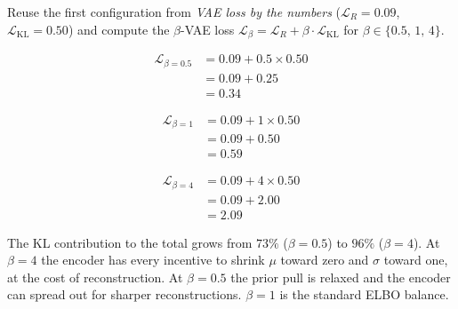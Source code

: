 

\vspace{2.5em}


Reuse the first configuration from \textit{VAE loss by the numbers} ($\mathcal{L}_R{=}0.09$, $\mathcal{L}_{\text{KL}}{=}0.50$) and compute the $\beta$-VAE loss $\mathcal{L}_\beta = \mathcal{L}_R + \beta \cdot \mathcal{L}_{\text{KL}}$ for $\beta \in \{0.5,\, 1,\, 4\}$.

\begin{align*}
    \mathcal{L}_{\beta=0.5} &= 0.09 + 0.5 \times 0.50 \\
                            &= 0.09 + 0.25 \\
                            &= 0.34
\end{align*}

\begin{align*}
    \mathcal{L}_{\beta=1} &= 0.09 + 1 \times 0.50 \\
                          &= 0.09 + 0.50 \\
                          &= 0.59
\end{align*}

\begin{align*}
    \mathcal{L}_{\beta=4} &= 0.09 + 4 \times 0.50 \\
                          &= 0.09 + 2.00 \\
                          &= 2.09
\end{align*}

The KL contribution to the total grows from $73\%$ ($\beta{=}0.5$) to $96\%$ ($\beta{=}4$). At $\beta{=}4$ the encoder has every incentive to shrink $\mu$ toward zero and $\sigma$ toward one, at the cost of reconstruction. At $\beta{=}0.5$ the prior pull is relaxed and the encoder can spread out for sharper reconstructions. $\beta{=}1$ is the standard ELBO balance.

